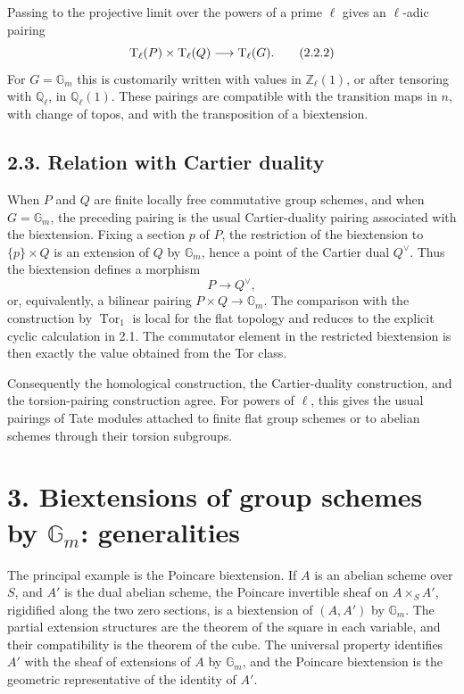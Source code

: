 \documentclass[11pt]{article}
\providecommand{\Tor}{\operatorname{Tor}}
\providecommand{\Ql}{\mathbb Q_\ell}
\providecommand{\Zl}{\mathbb Z_\ell}
\providecommand{\Gm}{\mathbb G_m}
\begin{document}
Passing to the projective limit over the powers of a prime \(\ell\) gives an \(\ell\)-adic pairing
\[
        \mathrm T_\ell(P)\times \mathrm T_\ell(Q)
        \longrightarrow \mathrm T_\ell(G).
\qquad\text{(2.2.2)}
\]
For \(G=\Gm\) this is customarily written with values in \(\Zl(1)\), or after tensoring with \(\Ql\), in \(\Ql(1)\).  These pairings are compatible with the transition maps in \(n\), with change of topos, and with the transposition of a biextension.

\subsection*{2.3. Relation with Cartier duality}

When \(P\) and \(Q\) are finite locally free commutative group schemes, and when \(G=\Gm\), the preceding pairing is the usual Cartier-duality pairing associated with the biextension.  Fixing a section \(p\) of \(P\), the restriction of the biextension to \(\{p\}\times Q\) is an extension of \(Q\) by \(\Gm\), hence a point of the Cartier dual \(Q^\vee\).  Thus the biextension defines a morphism
\[
        P\longrightarrow Q^\vee,
\]
or, equivalently, a bilinear pairing \(P\times Q\to \Gm\).  The comparison with the construction by \(\Tor_1\) is local for the flat topology and reduces to the explicit cyclic calculation in 2.1.  The commutator element in the restricted biextension is then exactly the value obtained from the Tor class.

Consequently the homological construction, the Cartier-duality construction, and the torsion-pairing construction agree.  For powers of \(\ell\), this gives the usual pairings of Tate modules attached to finite flat group schemes or to abelian schemes through their torsion subgroups.

\section*{3. Biextensions of group schemes by \(\Gm\): generalities}

The principal example is the Poincare biextension.  If \(A\) is an abelian scheme over \(S\), and \(A'\) is the dual abelian scheme, the Poincare invertible sheaf on \(A\times_S A'\), rigidified along the two zero sections, is a biextension of \((A,A')\) by \(\Gm\).  The partial extension structures are the theorem of the square in each variable, and their compatibility is the theorem of the cube.  The universal property identifies \(A'\) with the sheaf of extensions of \(A\) by \(\Gm\), and the Poincare biextension is the geometric representative of the identity of \(A'\).
\end{document}
